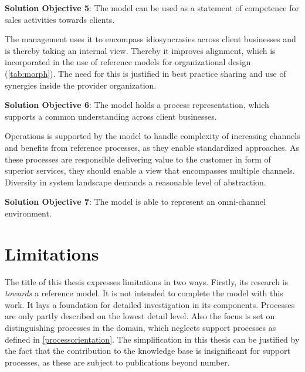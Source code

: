 \hfill\begin{minipage}{\dimexpr\textwidth-1.2cm}
	\textbf{Solution Objective 5}: The model can be used as a statement of competence for sales activities towards clients.
	
\end{minipage}

 The management uses it to encompass idiosyncrasies across client businesses and is thereby taking an internal view. Thereby it improves alignment, which is incorporated in the use of reference models for organizational design (\cf \Tab \ref{tab:morph}). The need for this is justified in best practice sharing and use of synergies inside the provider organization.
 
 
\hfill\begin{minipage}{\dimexpr\textwidth-1.2cm}
 \textbf{Solution Objective 6}: The model holds a process representation, which supports a common understanding across client businesses. 
 
\end{minipage}


 Operations is supported by the model to handle complexity of increasing channels and benefits from reference processes, as they enable standardized approaches. As these processes are responsible delivering value to the customer in form of superior services, they should enable a view that encompasses multiple channels. Diversity in system landscape demands a reasonable level of abstraction. 
 
	\hfill\begin{minipage}{\dimexpr\textwidth-1.2cm}
	\textbf{Solution Objective 7}: The model is able to represent an omni-channel environment. 
\end{minipage}

\section{Limitations}

The title of this thesis expresses limitations in two ways. Firstly, its research is \textit{towards} a reference model. It is not intended to complete the model with this work. It lays a foundation for detailed investigation in its components. Processes are only partly described on the lowest detail level. Also the focus is set on distinguishing processes in the domain, which neglects support processes as defined in \ref{processorientation}. The simplification in this thesis can be justified by the fact that the contribution to the knowledge base is insignificant for support processes, as these are subject to publications beyond number. 

